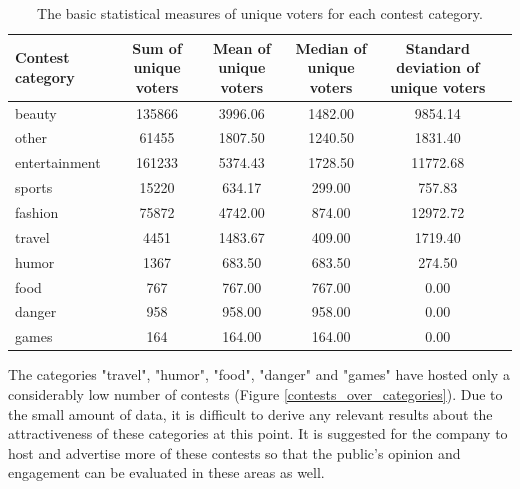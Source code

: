     \begin{table}[]
        \centering
        \begin{adjustbox}{width=1\textwidth}
            \begin{tabular}{l|c|c|c|c|c}
                \textbf{Contest category} & \textbf{Sum of unique voters} & \textbf{Mean of unique voters} & \textbf{Median of unique voters} & \textbf{Standard deviation of unique voters} \\
                \hline
                beauty & 135866 & 3996.06 & 1482.00 & 9854.14 \\
                other & 61455 & 1807.50 & 1240.50 & 1831.40 \\
                entertainment & 161233 & 5374.43 & 1728.50 & 11772.68 \\
                sports & 15220 & 634.17 & 299.00 & 757.83 \\
                fashion & 75872 & 4742.00 & 874.00 & 12972.72 \\
                travel & 4451 & 1483.67 & 409.00 & 1719.40 \\
                humor & 1367 & 683.50 & 683.50 & 274.50 \\
                food & 767 & 767.00 & 767.00 & 0.00 \\
                danger & 958 & 958.00 & 958.00 & 0.00 \\
                games & 164 & 164.00 & 164.00 & 0.00
            \end{tabular}
        \end{adjustbox}
        \caption{The basic statistical measures of unique voters for each contest category.}
        \label{user_engagement_over_categories}
    \end{table}
    
    The categories "travel", "humor", "food", "danger" and "games" have hosted only a considerably low number of contests (Figure \ref{contests_over_categories}). Due to the small amount of data, it is difficult to derive any relevant results about the attractiveness of these categories at this point. It is suggested for the company to host and advertise more of these contests so that the public's opinion and engagement can be evaluated in these areas as well.


